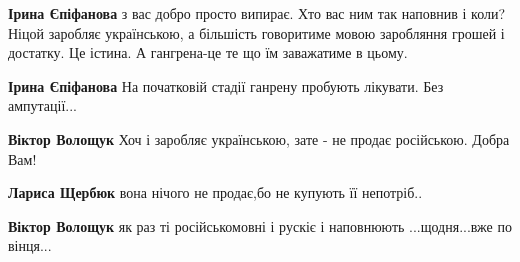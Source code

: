 \begin{itemize}
\begin{itemize}
\begin{itemize}
\textbf{Ірина Єпіфанова} з вас добро просто випирає. \Smiley[1.0][yellow] Хто вас ним так
наповнив і коли? Ніцой заробляє українською, а більшість говоритиме мовою
заробляння грошей і достатку. Це істина. А гангрена-це те що їм заважатиме в
цьому.

 
\textbf{Ірина Єпіфанова} На початковій стадії ганрену пробують лікувати. Без ампутації...

 
\textbf{Віктор Волощук} Хоч і заробляє українською, зате - не продає російською. Добра Вам!

 
\textbf{Лариса Щербюк} вона нічого не продає,бо не купують її непотріб..


 
\textbf{Віктор Волощук} як раз ті російськомовні і рускіє і наповнюють ...щодня...вже по вінця...

\end{itemize}

\end{itemize}

 


\end{itemize}
